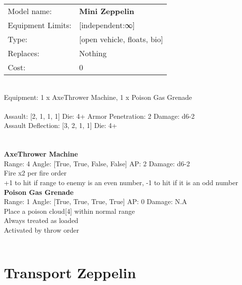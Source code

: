 \noindent
\begin{tabular}{ll}
Model name: &{\bf Mini Zeppelin } \\
Equipment Limits: &[independent:∞] \\
Type: &[open vehicle, floats, bio] \\
Replaces: &Nothing \\
Cost: & 0\\
\end{tabular}
\ \\
Equipment: 1 x AxeThrower Machine, 1 x Poison Gas Grenade \\
\ \\
Assault: [2, 1, 1, 1] Die: 4+ Armor Penetration: 2 Damage: d6-2 \\
Assault Deflection: [3, 2, 1, 1] Die: 4+\\
\indent  
\ \\

\ \\
{\bf AxeThrower Machine } \\



Range: 4  Angle: [True, True, False, False] AP: 2 Damage: d6-2 \\
Fire x2 per fire order\\ 
+1 to hit if range to enemy is an even number, -1 to hit if it is an odd number\\ 




{\bf Poison Gas Grenade } \\



Range: 1  Angle: [True, True, True, True] AP: 0 Damage: N.A \\
Place a poison cloud[4] within normal range\\ 
Always treated as loaded\\ 
Activated by throw order\\ 




 
\ \\













\clearpage

\section{ Transport Zeppelin }

